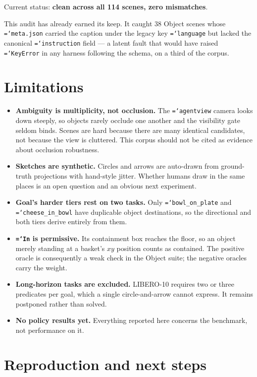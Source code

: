 \documentclass[11pt,a4paper]{article}
\newcommand{\code}[1]{\texttt{\small\hyphenchar\font=`\-\relax #1}}
\begin{document}
Current status: \textbf{clean across all 114 scenes, zero mismatches}.

This audit has already earned its keep. It caught 38 Object scenes whose
\code{meta.json} carried the caption under the legacy key \code{language} but
lacked the canonical \code{instruction} field --- a latent fault that would have
raised \code{KeyError} in any harness following the schema, on a third of the
corpus.

\section{Limitations}

\begin{itemize}
\item \textbf{Ambiguity is multiplicity, not occlusion.} The \code{agentview}
  camera looks down steeply, so objects rarely occlude one another and the
  visibility gate seldom binds. Scenes are hard because there are many identical
  candidates, not because the view is cluttered. This corpus should not be cited
  as evidence about occlusion robustness.
\item \textbf{Sketches are synthetic.} Circles and arrows are auto-drawn from
  ground-truth projections with hand-style jitter. Whether humans draw in the
  same places is an open question and an obvious next experiment.
\item \textbf{Goal's harder tiers rest on two tasks.} Only
  \code{bowl\_on\_plate} and \code{cheese\_in\_bowl} have duplicable object
  destinations, so the directional and both tiers derive entirely from them.
\item \textbf{\code{In} is permissive.} Its containment box reaches the floor, so
  an object merely standing at a basket's $xy$ position counts as contained. The
  positive oracle is consequently a weak check in the Object suite; the negative
  oracles carry the weight.
\item \textbf{Long-horizon tasks are excluded.} LIBERO-10 requires two or three
  predicates per goal, which a single circle-and-arrow cannot express. It remains
  postponed rather than solved.
\item \textbf{No policy results yet.} Everything reported here concerns the
  benchmark, not performance on it.
\end{itemize}

\section{Reproduction and next steps}
\end{document}
